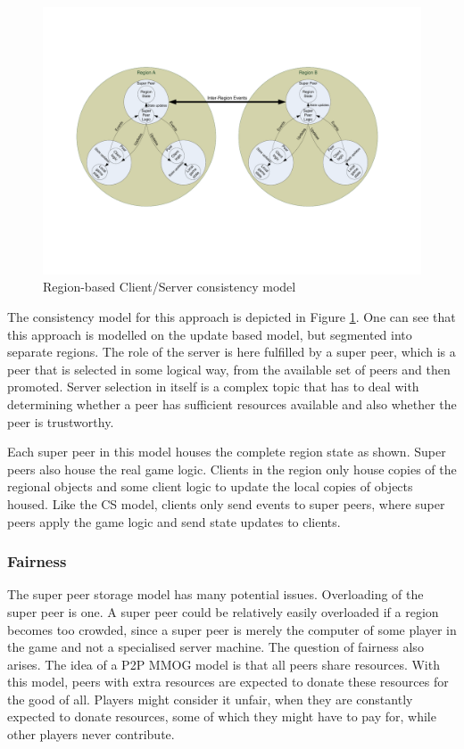 \documentclass[10pt,a4paper,journal,cspaper,compsoc]{IEEEtran}
\begin{document}
\begin{figure}[htbp]
 \centering
 \includegraphics[clip=true, viewport=2cm 5cm 27cm 16.5cm, width=\textwidth]{region_based_CS_CM}
 \caption{Region-based Client/Server consistency model}
 \label{fig_cs_region_cm}
\end{figure}
%
The consistency model for this approach is depicted in Figure \ref{fig_cs_region_cm}. One can see that this approach is modelled on the update based
model, but segmented into separate regions. The role of the server is here fulfilled by a super peer, which is a peer that is selected in some
logical way, from the available set of peers and then promoted. Server selection in itself is a complex topic that has to deal with determining
whether a peer has sufficient resources available and also whether the peer is trustworthy.

Each super peer in this model houses the complete region state as shown. Super peers also house the real game logic. Clients in the region only house
copies of the regional objects and some client logic to update the local copies of objects housed. Like the \ac{CS} model, clients only send events
to super peers, where super peers apply the game logic and send state updates to clients.

\subsubsection{Fairness}
The super peer storage model has many potential issues. Overloading of the super peer is one. A super peer could be relatively easily overloaded if a
region becomes too crowded, since a super peer is merely the computer of some player in the game and not a specialised server machine. The question
of fairness also arises. The idea of a P2P MMOG model is that all peers share resources. With this model, peers with extra resources are expected to
donate these resources for the good of all. Players might consider it unfair, when they are constantly expected to donate resources, some of which
they might have to pay for, while other players never contribute.
\end{document}
